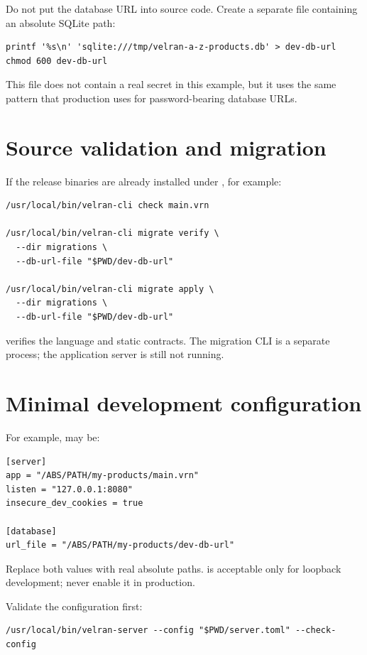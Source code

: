 Do not put the database URL into source code. Create a separate file containing an absolute SQLite path:

\begin{lstlisting}
printf '%s\n' 'sqlite:///tmp/velran-a-z-products.db' > dev-db-url
chmod 600 dev-db-url
\end{lstlisting}

This file does not contain a real secret in this example, but it uses the same  pattern that production uses for password-bearing database URLs.

\section{Source validation and migration}

If the release binaries are already installed under , for example:

\begin{lstlisting}
/usr/local/bin/velran-cli check main.vrn

/usr/local/bin/velran-cli migrate verify \
  --dir migrations \
  --db-url-file "$PWD/dev-db-url"

/usr/local/bin/velran-cli migrate apply \
  --dir migrations \
  --db-url-file "$PWD/dev-db-url"
\end{lstlisting}

\code{check} verifies the language and static contracts. The migration CLI is a separate process; the application server is still not running.

\section{Minimal development configuration}

For example, \code{server.toml} may be:

\begin{lstlisting}
[server]
app = "/ABS/PATH/my-products/main.vrn"
listen = "127.0.0.1:8080"
insecure_dev_cookies = true

[database]
url_file = "/ABS/PATH/my-products/dev-db-url"
\end{lstlisting}

Replace both  values with real absolute paths.  is acceptable only for loopback development; never enable it in production.

Validate the configuration first:

\begin{lstlisting}
/usr/local/bin/velran-server --config "$PWD/server.toml" --check-config
\end{lstlisting}

